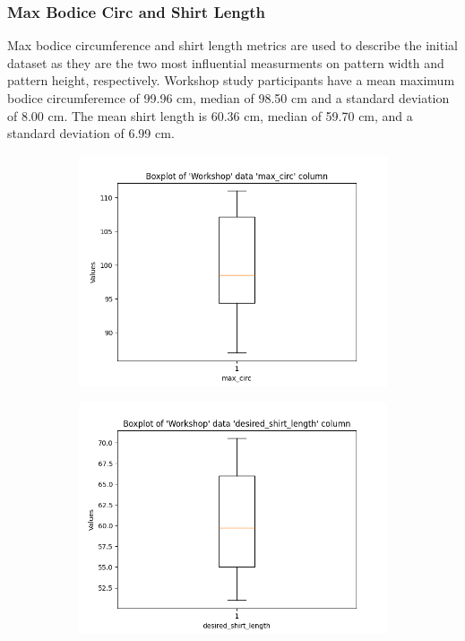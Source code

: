 \subsubsection{Max Bodice Circ and Shirt Length}
Max bodice circumference and shirt length metrics are used to describe the initial dataset as they are the two most influential measurments on pattern width and pattern height, respectively.
Workshop study participants have a mean maximum bodice circumferemce of 99.96 cm, median of 98.50 cm and a standard deviation of 8.00 cm. The mean shirt length is 60.36 cm, median of 59.70 cm, and a standard deviation of 6.99 cm.
\begin{figure}[H]
    \centering
    \begin{subfigure}[b]{0.45\textwidth}
        \centering
        \includegraphics[width=\textwidth]{Images/Workshop_max_circ_Boxplot.png}
        \caption{}
    \end{subfigure}
    \hfill
    \begin{subfigure}[b]{0.45\textwidth}
        \centering
        \includegraphics[width=\textwidth]{Images/Workshop_desired_shirt_length_Boxplot.png}
        \caption{}
    \end{subfigure}
    \caption{}
\end{figure}

